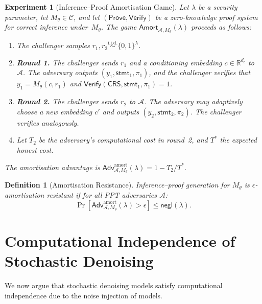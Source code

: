 \documentclass[11pt]{article}
\newtheorem{definition}{Definition}[section]
\newtheorem{experiment}{Experiment}[section]
\newcommand{\negl}{\mathsf{negl}}
\newcommand{\calA}{\mathcal{A}}
\newcommand{\calC}{\mathcal{C}}
\newcommand{\Prove}{\mathsf{Prove}}
\newcommand{\Verify}{\mathsf{Verify}}
\begin{document}
\begin{experiment}[Inference--Proof Amortisation Game]
\label{exp:amortisation}
Let $\lambda$ be a security parameter, let $M_\theta \in \calC$, and let $(\Prove, \Verify)$ be a zero-knowledge proof system for correct inference under~$M_\theta$. The game $\mathsf{Amort}_{\calA, M_\theta}(\lambda)$ proceeds as follows:

\begin{enumerate}[nosep]
    \item The challenger samples $r_1, r_2 \overset{\mathrm{i.i.d.}}{\sim} \{0,1\}^\lambda$.
    \item \textbf{Round 1.} The challenger sends $r_1$ and a conditioning embedding $c \in \mathbb{R}^{d_c}$ to $\calA$. The adversary outputs $(y_1, \mathsf{stmt}_1, \pi_1)$, and the challenger verifies that $y_1 = M_\theta(c, r_1)$ and $\Verify(\mathsf{CRS}, \mathsf{stmt}_1, \pi_1) = 1$.
    \item \textbf{Round 2.} The challenger sends $r_2$ to $\calA$. The adversary may adaptively choose a new embedding $c'$ and outputs $(y_2, \mathsf{stmt}_2, \pi_2)$. The challenger verifies analogously.
    \item Let $T_2$ be the adversary's computational cost in round~2, and $T^*$ the expected honest cost.
\end{enumerate}

\noindent The \emph{amortisation advantage} is $\mathsf{Adv}^{\mathrm{amort}}_{\calA, M_\theta}(\lambda) = 1 - T_2 / T^*$.
\end{experiment}

\begin{definition}[Amortisation Resistance]
\label{def:amort-resist}
Inference--proof generation for $M_\theta$ is \emph{$\epsilon$-amortisation resistant} if for all PPT adversaries $\calA$:
\[
    \Pr\!\left[\mathsf{Adv}^{\mathrm{amort}}_{\calA, M_\theta}(\lambda) > \epsilon \right] \leq \negl(\lambda).
\]
\end{definition}


\section{Computational Independence of Stochastic Denoising}
\label{sec:independence-thm}

We now argue that stochastic denoising models satisfy computational independence due to the noise injection of models.
\end{document}
